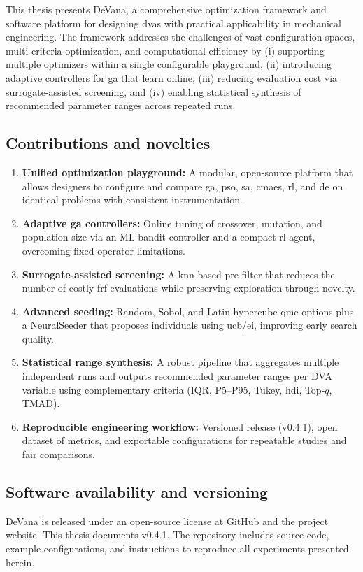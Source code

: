 \documentclass[12pt,a4paper]{article}
\newcommand{\softwareName}{DeVana}
\newcommand{\softwareVersion}{v0.4.1}
\begin{document}
This thesis presents \softwareName{}, a comprehensive optimization framework and software platform for designing \glspl{dva} with practical applicability in mechanical engineering. The framework addresses the challenges of vast configuration spaces, multi-criteria optimization, and computational efficiency by (i) supporting multiple optimizers within a single configurable playground, (ii) introducing adaptive controllers for \gls{ga} that learn online, (iii) reducing evaluation cost via surrogate-assisted screening, and (iv) enabling statistical synthesis of recommended parameter ranges across repeated runs.

\subsection{Contributions and novelties}
\label{subsec:contributions}
\begin{enumerate}
    \item \textbf{Unified optimization playground:} A modular, open-source platform that allows designers to configure and compare \gls{ga}, \gls{pso}, \gls{sa}, \gls{cmaes}, \gls{rl}, and \gls{de} on identical problems with consistent instrumentation.
    \item \textbf{Adaptive \gls{ga} controllers:} Online tuning of crossover, mutation, and population size via an ML-bandit controller and a compact \gls{rl} agent, overcoming fixed-operator limitations.
    \item \textbf{Surrogate-assisted screening:} A \gls{knn}-based pre-filter that reduces the number of costly \gls{frf} evaluations while preserving exploration through novelty.
    \item \textbf{Advanced seeding:} Random, Sobol, and Latin hypercube \gls{qmc} options plus a NeuralSeeder that proposes individuals using \gls{ucb}/\gls{ei}, improving early search quality.
    \item \textbf{Statistical range synthesis:} A robust pipeline that aggregates multiple independent runs and outputs recommended parameter ranges per DVA variable using complementary criteria (IQR, P5--P95, Tukey, \gls{hdi}, Top-$q$, TMAD).
    \item \textbf{Reproducible engineering workflow:} Versioned release (\softwareVersion{}), open dataset of metrics, and exportable configurations for repeatable studies and fair comparisons.
\end{enumerate}

\subsection{Software availability and versioning}
\label{subsec:availability}
\softwareName{} is released under an open-source license at GitHub and the project website. This thesis documents \softwareVersion{}. The repository includes source code, example configurations, and instructions to reproduce all experiments presented herein.
\end{document}
